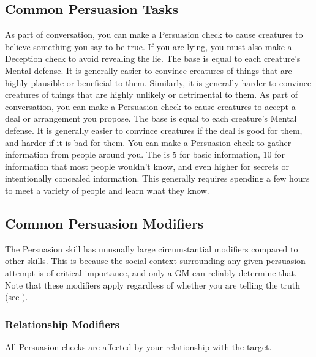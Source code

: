  \subsection{Common Persuasion Tasks}
     As part of conversation, you can make a Persuasion check to cause creatures to believe something you say to be true.
    If you are lying, you must also make a Deception check to avoid revealing the lie.
    The base  is equal to each creature's Mental defense.
    It is generally easier to convince creatures of things that are highly plausible or beneficial to them.
    Similarly, it is generally harder to convince creatures of things that are highly unlikely or detrimental to them.
     As part of conversation, you can make a Persuasion check to cause creatures to accept a deal or arrangement you propose.
    The base  is equal to each creature's Mental defense.
    It is generally easier to convince creatures if the deal is good for them, and harder if it is bad for them.
     You can make a Persuasion check to gather information from people around you.
    The  is 5 for basic information, 10 for information that most people wouldn't know, and even higher for secrets or intentionally concealed information.
    This generally requires spending a few hours to meet a variety of people and learn what they know.

  \subsection{Common Persuasion Modifiers}
    The Persuasion skill has unusually large circumstantial modifiers compared to other skills.
    This is because the social context surrounding any given persuasion attempt is of critical importance, and only a GM can reliably determine that.
    Note that these modifiers apply regardless of whether you are telling the truth (see ).

    \subsubsection{Relationship Modifiers}
      All Persuasion checks are affected by your relationship with the target.

